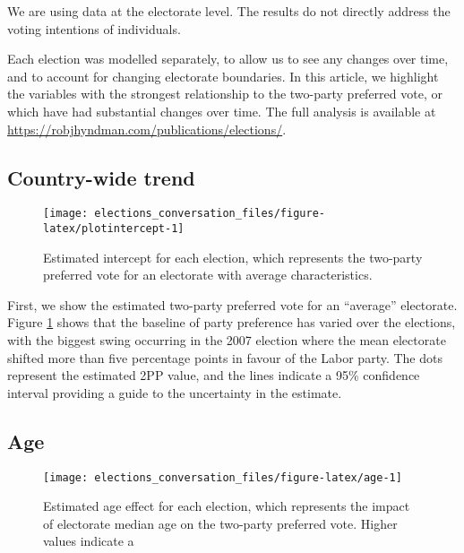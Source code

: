 \documentclass[11pt,a4paper,]{article}
\begin{document}
We are using data at the electorate level. The results do not directly address the voting intentions of individuals.

Each election was modelled separately, to allow us to see any changes over time, and to account for changing electorate boundaries. In this article, we highlight the variables with the strongest relationship to the two-party preferred vote, or which have had substantial changes over time. The full analysis is available at \url{https://robjhyndman.com/publications/elections/}.

\hypertarget{country-wide-trend}{%
\subsection*{Country-wide trend}\label{country-wide-trend}}

\begin{figure}[H]

{\centering \texttt{[image: elections\_conversation\_files/figure-latex/plotintercept-1]} 

}

\caption{Estimated intercept for each election, which represents the two-party preferred vote for an electorate with average characteristics.}\label{fig:plotintercept}
\end{figure}

First, we show the estimated two-party preferred vote for an ``average'' electorate. Figure \ref{fig:plotintercept} shows that the baseline of party preference has varied over the elections, with the biggest swing occurring in the 2007 election where the mean electorate shifted more than five percentage points in favour of the Labor party. The dots represent the estimated 2PP value, and the lines indicate a 95\% confidence interval providing a guide to the uncertainty in the estimate.

\hypertarget{age}{%
\subsection*{Age}\label{age}}

\begin{figure}[H]

{\centering \texttt{[image: elections\_conversation\_files/figure-latex/age-1]} 

}

\caption{Estimated age effect for each election, which represents the impact of electorate median age on the two-party preferred vote. Higher values indicate a }\label{fig:age}
\end{figure}
\end{document}
